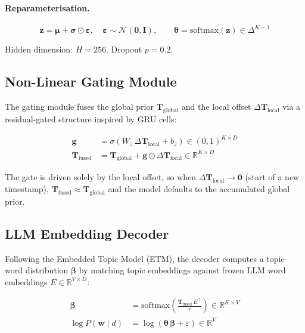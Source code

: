 \documentclass[11pt,a4paper]{article}
\begin{document}
\paragraph{Reparameterisation.}
\[
  \mathbf{z} = \boldsymbol{\mu} + \boldsymbol{\sigma} \odot \boldsymbol{\varepsilon},
  \quad \boldsymbol{\varepsilon} \sim \mathcal{N}(\mathbf{0}, \mathbf{I}),
  \qquad \boldsymbol{\theta} = \text{softmax}(\mathbf{z}) \in \Delta^{K-1}
\]

Hidden dimension: $H=256$. Dropout $p=0.2$.

\subsection{Non-Linear Gating Module}

The gating module fuses the global prior $\mathbf{T}_\text{global}$ and the local offset
$\Delta\mathbf{T}_\text{local}$ via a residual-gated structure inspired by GRU cells:

\begin{align}
  \mathbf{g} &= \sigma\!\left(W_z\,\Delta\mathbf{T}_\text{local} + b_z\right)
               \in (0,1)^{K \times D} \label{eq:gate}\\
  \mathbf{T}_\text{fused} &= \mathbf{T}_\text{global}
                             + \mathbf{g} \odot \Delta\mathbf{T}_\text{local}
               \in \mathbb{R}^{K \times D} \label{eq:fused}
\end{align}

The gate is driven solely by the local offset, so when $\Delta\mathbf{T}_\text{local} \to \mathbf{0}$
(start of a new timestamp), $\mathbf{T}_\text{fused} \approx \mathbf{T}_\text{global}$ and the
model defaults to the accumulated global prior.

\subsection{LLM Embedding Decoder}

Following the Embedded Topic Model (ETM), the decoder computes a topic-word distribution
$\boldsymbol{\beta}$ by matching topic embeddings against frozen LLM word embeddings $E \in \mathbb{R}^{V \times D}$:

\begin{align}
  \boldsymbol{\beta} &= \text{softmax}\!\left(
      \frac{\mathbf{T}_\text{fused}\, E^\top}{\tau}
    \right) \in \mathbb{R}^{K \times V} \label{eq:beta}\\
  \log P(\mathbf{w} \mid d) &= \log\!\left(\boldsymbol{\theta}\,\boldsymbol{\beta} + \varepsilon\right)
               \in \mathbb{R}^V \label{eq:recon}
\end{align}
\end{document}
